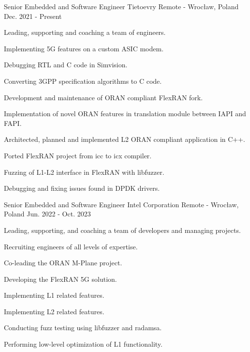

\begin{cventries}

  \cventry
    {Senior Embedded and Software Engineer} %
    {Tietoevry} %
    {Remote - Wrocław, Poland} %
    {Dec. 2021 - Present} %
    {
      \begin{cvitems} %
          \item { Leading, supporting and coaching a team of engineers. }
          \item { Implementing 5G features on a custom ASIC modem. }
          \item { Debugging RTL and C code in Simvision. }
          \item { Converting 3GPP specification algorithms to C code. }
          \item { Development and maintenance of ORAN compliant FlexRAN fork. }
          \item { Implementation of novel ORAN features in translation module between IAPI and FAPI. }
          \item { Architected, planned and implemented L2 ORAN compliant application in C++. }
          \item { Ported FlexRAN project from icc to icx compiler. }
          \item { Fuzzing of L1-L2 interface in FlexRAN with libfuzzer. }
          \item { Debugging and fixing issues found in DPDK drivers. }
      \end{cvitems}
    }

  \cventry
    {Senior Embedded and Software Engineer} %
    {Intel Corporation} %
    {Remote - Wrocław, Poland} %
    {Jun. 2022 - Oct. 2023} %
    {
    	\begin{cvitems}
			\item {Leading, supporting, and coaching a team of developers and managing projects.}
			\item {Recruiting engineers of all levels of expertise.}
			\item {Co-leading the ORAN M-Plane project.}
			\item {Developing the FlexRAN 5G solution.}
			\item {Implementing L1 related features.}
			\item {Implementing L2 related features.}
			\item {Conducting fuzz testing using libfuzzer and radamsa.}
			\item {Performing low-level optimization of L1 functionality.}
		\end{cvitems}
    }



\end{cventries}
